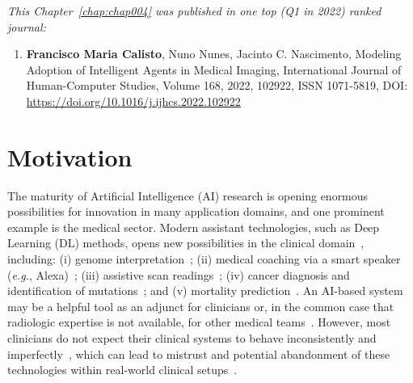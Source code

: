\clearpage
\label{chap:chap004}

\vspace{0.5mm}

\noindent
{\it This Chapter~\ref{chap:chap004} was published in one top (Q1 in 2022) ranked journal:}

\vspace{0.5mm}

\begin{enumerate}
\item {\bf Francisco Maria Calisto}, Nuno Nunes, Jacinto C. Nascimento, Modeling Adoption of Intelligent Agents in Medical Imaging, International Journal of Human-Computer Studies, Volume 168, 2022, 102922, ISSN 1071-5819, DOI: \href{https://doi.org/10.1016/j.ijhcs.2022.102922}{https://doi.org/10.1016/j.ijhcs.2022.102922}
\end{enumerate}

\vspace{0.5mm}

\section{Motivation}
\label{sec:chap004001}

The maturity of Artificial Intelligence (AI) research is opening enormous possibilities for innovation in many application domains, and one prominent example is the medical sector.
Modern assistant technologies, such as Deep Learning (DL) methods, opens new possibilities in the clinical domain~\cite{topol2019high}, including:
(i) genome interpretation~\cite{sundaram2018predicting};
(ii) medical coaching via a smart speaker ({\it e.g.}, Alexa)~\cite{bickmore2018patient};
(iii) assistive scan readings~\cite{madani2018deep};
(iv) cancer diagnosis and identification of mutations~\cite{coudray2018classification}; and
(v) mortality prediction~\cite{ahmad2018death}.
An AI-based system may be a helpful tool as an adjunct for clinicians or, in the common case that radiologic expertise is not available, for other medical teams~\cite{doi:10.1148/radiol.2020201874, doi:10.1148/radiol.2020190283}.
However, most clinicians do not expect their clinical systems to behave inconsistently and imperfectly~\cite{hoff2015trust, Kocielnik:2019:YAI:3290605.3300641}, which can lead to mistrust and potential abandonment of these technologies within real-world clinical setups~\cite{benrimoh2018aifred, CALISTO2021102607, CALISTO2022102285}.

